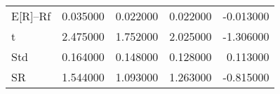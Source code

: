 \begin{tabular}{lrrrr}
\toprule
\midrule
E[R]--Rf & 0.035000 & 0.022000 & 0.022000 & -0.013000 \\
t & 2.475000 & 1.752000 & 2.025000 & -1.306000 \\
Std & 0.164000 & 0.148000 & 0.128000 & 0.113000 \\
SR & 1.544000 & 1.093000 & 1.263000 & -0.815000 \\
\bottomrule
\end{tabular}
